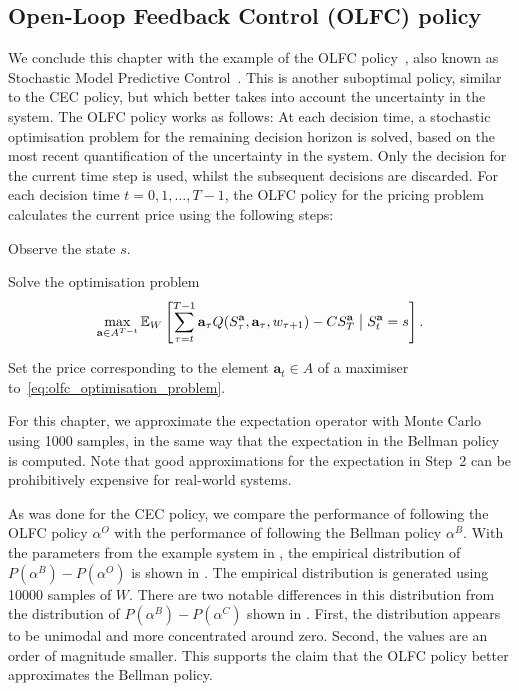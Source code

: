 \documentclass[main.tex]{subfiles}
\begin{document}
\subsection{Open-Loop Feedback Control (OLFC) policy}
We conclude this chapter with the example of the OLFC
policy~\citep[Ch.~6]{bertsekas2005dynamic},
also known as Stochastic Model
Predictive Control~\citep{farmer2017uncertainty}. This is another suboptimal policy,
similar to the CEC policy, but which better takes into account the uncertainty in the system.
The OLFC policy works as follows: At each decision time, a stochastic
optimisation problem for the remaining decision horizon is
solved, based on the most recent quantification of the uncertainty in the
system. Only the decision for the current time step is used, whilst
the subsequent decisions are discarded.
For each decision time $t=0,1,\dots,T-1$, the OLFC policy for the
pricing problem calculates the current price using the following steps:
\begin{enumerate}
  \begin{samepage}
  \item Observe the state $s$.
  \item Solve the optimisation problem
    \begin{equation}\label{eq:olfc_optimisation_problem}
      \max_{\mathbf a\in A^{T-t}}\mathbb{E}_W\left[
        \sum_{\tau=t}^{T-1}\mathbf a_\tau Q(S_\tau^{\mathbf a},\mathbf
        a_\tau,w_{\tau+1})-CS_T^{\mathbf a} \bigm\vert S_t^{\mathbf a}=s \right].
    \end{equation}
  \item Set the price corresponding to the element
    $\mathbf{a}_t\in A$ of a maximiser
    to~\eqref{eq:olfc_optimisation_problem}.
  \end{samepage}
\end{enumerate}
For this chapter, we approximate the expectation operator with
Monte Carlo using \num{1000} samples, in the same way that the expectation
in the Bellman policy is computed.
Note that good approximations for the expectation in Step~2 can be
prohibitively expensive for real-world systems.

As was done for the CEC policy, we compare the performance of following the
OLFC policy $\alpha^O$ with the performance of following the Bellman
policy $\alpha^B$. With the parameters from the example system in
,
the empirical distribution of $P(\alpha^B)-P(\alpha^O)$ is shown in
. The empirical distribution is generated
using \num{10000} samples of $W$.
There are two notable differences in this distribution from the
distribution of $P(\alpha^B)-P(\alpha^C)$ shown in .
First, the distribution appears to be unimodal and more concentrated around zero. Second,
the values are an order of magnitude smaller.
This supports the claim that the OLFC policy better approximates the
Bellman policy.
\end{document}
